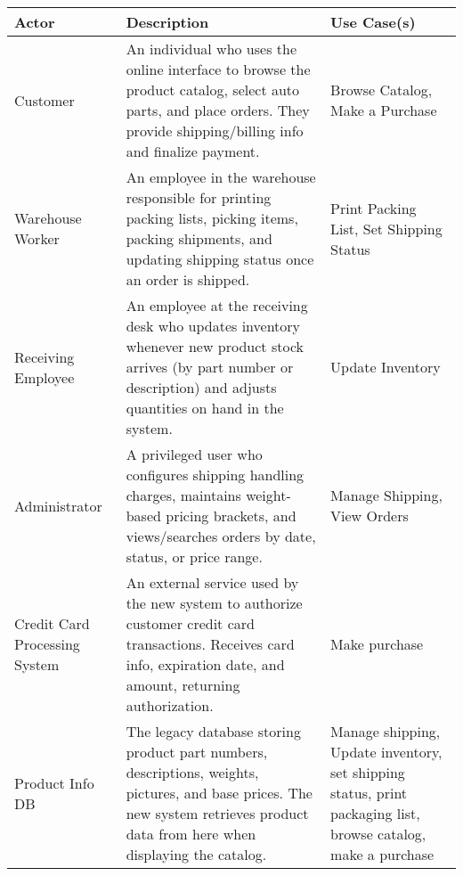 \documentclass{report}
\begin{document}
    \pagebreak 
    \bigbreak \noindent 
    \begin{center}
        \begin{tabular}{|p{2cm}|p{7cm}|p{5.2cm}|}
            \hline
            Actor	&Description	&Use Case(s) \\
            \hline
            Customer&	An individual who uses the online interface to browse the product catalog, select auto parts, and place orders. They provide shipping/billing info and finalize payment.	&Browse Catalog, Make a Purchase \\
            \hline
            Warehouse Worker	&An employee in the warehouse responsible for printing packing lists, picking items, packing shipments, and updating shipping status once an order is shipped.	&Print Packing List, Set Shipping Status \\
            \hline
            Receiving Employee	&An employee at the receiving desk who updates inventory whenever new product stock arrives (by part number or description) and adjusts quantities on hand in the system.	&Update Inventory \\
            \hline
            Administrator	&A privileged user who configures shipping  handling charges, maintains weight-based pricing brackets, and views/searches orders by date, status, or price range.	&Manage Shipping, View Orders \\
            \hline
            Credit Card Processing System	&An external service used by the new system to authorize customer credit card transactions. Receives card info, expiration date, and amount, returning authorization.	& Make purchase \\
            \hline
            Product Info DB	&The legacy database storing product part numbers, descriptions, weights, pictures, and base prices. The new system retrieves product data from here when displaying the catalog.	&Manage shipping, Update inventory, set shipping status, print packaging list, browse catalog, make a purchase\\
            \hline
        \end{tabular}
    \end{center}

    \pagebreak 
    \bigbreak \noindent 
\end{document}
